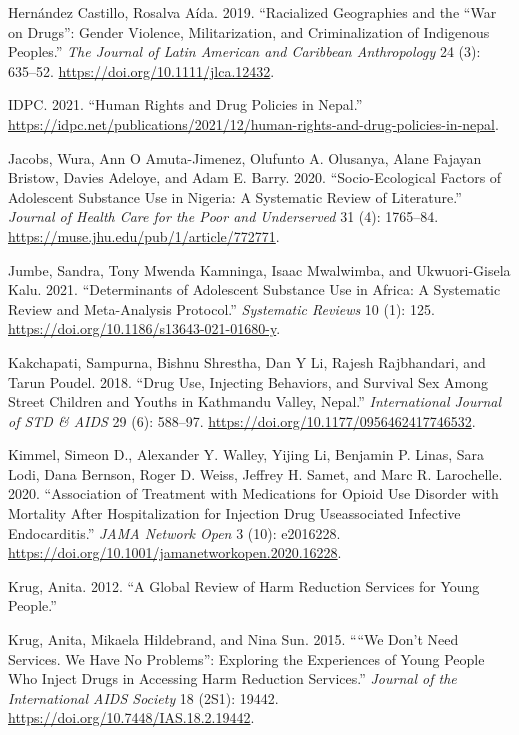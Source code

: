 \documentclass[
  letterpaper,
  DIV=11,
  numbers=noendperiod]{scrartcl}
\newlength{\cslhangindent}
\newenvironment{CSLReferences}[2] %
 {\begin{list}{}{%
  \setlength{\itemindent}{0pt}
  \setlength{\leftmargin}{0pt}
  \setlength{\parsep}{0pt}
  \ifodd #1
   \setlength{\leftmargin}{\cslhangindent}
   \setlength{\itemindent}{-1\cslhangindent}
  \fi
  \setlength{\itemsep}{#2\baselineskip}}}
 {\end{list}}
\begin{document}
\begin{CSLReferences}{1}{0}
Hernández Castillo, Rosalva Aída. 2019. {``Racialized Geographies and
the {``}War on Drugs{''}: Gender Violence, Militarization, and
Criminalization of Indigenous Peoples.''} \emph{The Journal of Latin
American and Caribbean Anthropology} 24 (3): 635--52.
\url{https://doi.org/10.1111/jlca.12432}.

IDPC. 2021. {``Human Rights and Drug Policies in Nepal.''}
\url{https://idpc.net/publications/2021/12/human-rights-and-drug-policies-in-nepal}.

Jacobs, Wura, Ann O Amuta-Jimenez, Olufunto A. Olusanya, Alane Fajayan
Bristow, Davies Adeloye, and Adam E. Barry. 2020. {``Socio-Ecological
Factors of Adolescent Substance Use in Nigeria: A Systematic Review of
Literature.''} \emph{Journal of Health Care for the Poor and
Underserved} 31 (4): 1765--84.
\url{https://muse.jhu.edu/pub/1/article/772771}.

Jumbe, Sandra, Tony Mwenda Kamninga, Isaac Mwalwimba, and Ukwuori-Gisela
Kalu. 2021. {``Determinants of Adolescent Substance Use in Africa: A
Systematic Review and Meta-Analysis Protocol.''} \emph{Systematic
Reviews} 10 (1): 125. \url{https://doi.org/10.1186/s13643-021-01680-y}.

Kakchapati, Sampurna, Bishnu Shrestha, Dan Y Li, Rajesh Rajbhandari, and
Tarun Poudel. 2018. {``Drug Use, Injecting Behaviors, and Survival Sex
Among Street Children and Youths in Kathmandu Valley, Nepal.''}
\emph{International Journal of STD \& AIDS} 29 (6): 588--97.
\url{https://doi.org/10.1177/0956462417746532}.

Kimmel, Simeon D., Alexander Y. Walley, Yijing Li, Benjamin P. Linas,
Sara Lodi, Dana Bernson, Roger D. Weiss, Jeffrey H. Samet, and Marc R.
Larochelle. 2020. {``Association of Treatment with Medications for
Opioid Use Disorder with Mortality After Hospitalization for Injection
Drug Use{\textendash}associated Infective Endocarditis.''} \emph{JAMA
Network Open} 3 (10): e2016228.
\url{https://doi.org/10.1001/jamanetworkopen.2020.16228}.

Krug, Anita. 2012. {``A Global Review of Harm Reduction Services for
Young People.''}

Krug, Anita, Mikaela Hildebrand, and Nina Sun. 2015. {``{``}We Don't
Need Services. We Have No Problems{''}: Exploring the Experiences of
Young People Who Inject Drugs in Accessing Harm Reduction Services.''}
\emph{Journal of the International AIDS Society} 18 (2S1): 19442.
\url{https://doi.org/10.7448/IAS.18.2.19442}.


\end{CSLReferences}
\end{document}
